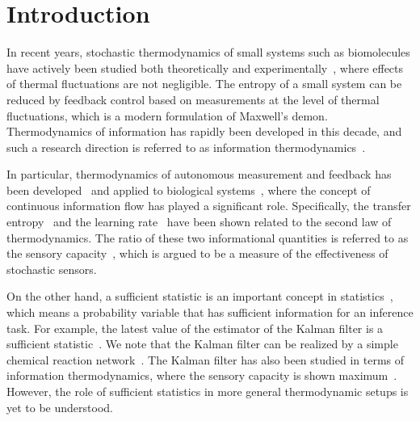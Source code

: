 \documentclass[%
 reprint,
 amsmath,amssymb,
 aps,
]{revtex4-1}
\theoremstyle{plain}
\begin{document}


\section{\label{sec:int}Introduction}
In recent years, stochastic thermodynamics of small systems such as biomolecules have actively been studied both theoretically and experimentally~\cite{Seifert2012,Ciliberto2017}, where effects of thermal fluctuations are not negligible. The entropy of a small system can be reduced by feedback control based on measurements at the level of thermal fluctuations, which is a modern formulation of Maxwell's demon. Thermodynamics of information has rapidly been developed in this decade, and such a research direction is referred to as information thermodynamics~\cite{Parrondo2015}. 

In particular, thermodynamics of autonomous measurement and feedback has been developed~\cite{Allahverdyan2009,Sagawa2012,Ito2013,Hartich2014,Horowitz2014(2),Horowitz2014,Prokopenko2015,Shiraishi2015(2),Shiraishi2015,SMS2016,Yamamoto2016,Rosinberg2016,Hartich2016,phd} and applied to biological systems~\cite{Barato2013,phd,Barato2014,Sartori2014,Itoecoli,Sartori2015,Hartich2016,Ouldridge2017(PRL),Ouldridge2017(PRX)}, where the concept of  continuous information flow has played a significant role. Specifically, the transfer entropy~\cite{Allahverdyan2009,Ito2013,Sagawa2012,Prokopenko2015,Hartich2014,Hartich2016,phd,Schreiber2000} and the learning rate~\cite{Allahverdyan2009,Barato2014,Hartich2016,Brittain2017,Shiraishi2015(2),phd} have been shown related to the second law of thermodynamics. The ratio of these two informational quantities is referred to as the sensory capacity~\cite{Hartich2016,phd}, which is argued to be a measure of the effectiveness of stochastic sensors.  

On the other hand, a sufficient statistic is an important concept in statistics~\cite{Cover2006}, which means a probability variable that has sufficient information for an inference task. For example, the latest value of the estimator of the Kalman filter is a sufficient statistic~\cite{Astrom}. We note that the Kalman filter can be realized by a simple chemical reaction network~\cite{Kobayashi2010}.  The Kalman filter has also been studied in terms of information thermodynamics, where the sensory capacity is shown maximum~\cite{Horowitz2014,Hartich2016}.  However, the role of sufficient statistics in more general thermodynamic setups is yet to be understood.
\end{document}
